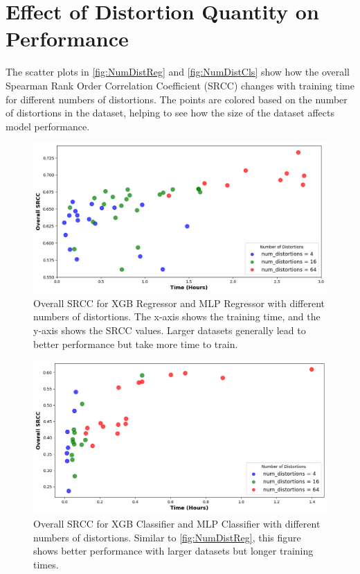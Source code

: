 \clearpage
\section{Effect of Distortion Quantity on Performance}
\label{sec:DistQuant}
The scatter plots in \autoref{fig:NumDistReg} and \autoref{fig:NumDistCls} show how the overall Spearman Rank Order Correlation Coefficient (SRCC) changes with training time for different numbers of distortions. The points are colored based on the number of distortions in the dataset, helping to see how the size of the dataset affects model performance. \par

\begin{figure}[ht]
    \centering
    \includegraphics[keepaspectratio,width=13.5cm]{img/num_dist_reg.png}
    \caption{Overall SRCC for XGB Regressor and MLP Regressor with different numbers of distortions. The x-axis shows the training time, and the y-axis shows the SRCC values. Larger datasets generally lead to better performance but take more time to train.}
    \label{fig:NumDistReg}
\end{figure}
\begin{figure}[ht]
    \centering
    \includegraphics[keepaspectratio,width=13.5cm]{img/num_dist_cls.png}
    \caption{Overall SRCC for XGB Classifier and MLP Classifier with different numbers of distortions. Similar to \autoref{fig:NumDistReg}, this figure shows better performance with larger datasets but longer training times.}
    \label{fig:NumDistCls}
\end{figure}

